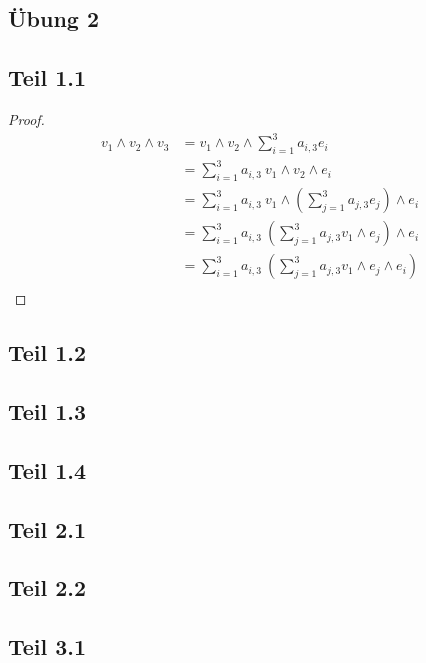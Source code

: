 \documentclass[10pt,a4paper]{article}
\begin{document}
\subsection*{Übung 2}

\subsection*{Teil 1.1}

\begin{proof}
\begin{align*}
v_{1} \wedge v_{2} \wedge v_{3} & = v_{1} \wedge v_{2} \wedge \sum_{i = 1}^{3} a_{i, 3} e_{i}\\
& = \sum_{i = 1}^{3} a_{i, 3}\ v_{1} \wedge v_{2} \wedge e_{i}\\
& = \sum_{i = 1}^{3} a_{i, 3}\ v_{1} \wedge \left( \sum_{j = 1}^{3} a_{j, 3} e_{j} \right) \wedge e_{i}\\
& = \sum_{i = 1}^{3} a_{i, 3}\ \left( \sum_{j = 1}^{3} a_{j, 3} v_{1} \wedge e_{j} \right) \wedge e_{i}\\
& = \sum_{i = 1}^{3} a_{i, 3}\ \left( \sum_{j = 1}^{3} a_{j, 3} v_{1} \wedge e_{j}  \wedge e_{i}\right)\\
\end{align*}
\end{proof}

\subsection*{Teil 1.2}

\subsection*{Teil 1.3}

\subsection*{Teil 1.4}

\subsection*{Teil 2.1}

\subsection*{Teil 2.2}

\subsection*{Teil 3.1}
\end{document}
